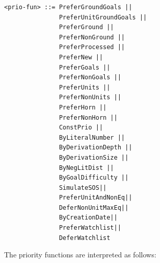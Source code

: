 \documentclass{report}
\begin{document}
\begin{verbatim}
<prio-fun> ::= PreferGroundGoals ||
               PreferUnitGroundGoals ||
               PreferGround ||
               PreferNonGround ||
               PreferProcessed ||
               PreferNew ||
               PreferGoals ||
               PreferNonGoals ||
               PreferUnits ||
               PreferNonUnits ||
               PreferHorn ||
               PreferNonHorn ||
               ConstPrio ||
               ByLiteralNumber ||
               ByDerivationDepth ||
               ByDerivationSize ||
               ByNegLitDist ||
               ByGoalDifficulty ||
               SimulateSOS||
               PreferUnitAndNonEq||
               DeferNonUnitMaxEq||
               ByCreationDate||
               PreferWatchlist||
               DeferWatchlist
\end{verbatim}

The priority functions are interpreted as follows:
\end{document}
